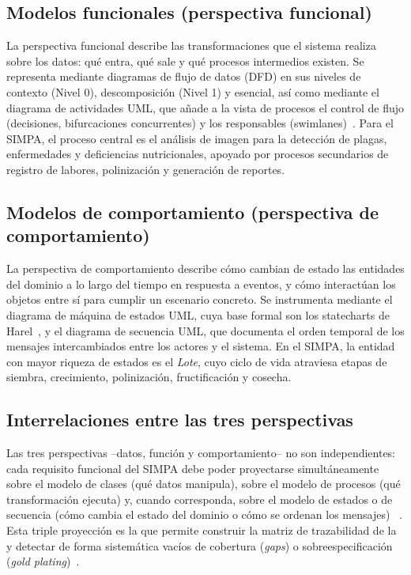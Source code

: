 \documentclass[11pt,a4paper]{report}
\begin{document}
\subsection{Modelos funcionales (perspectiva funcional)}

La perspectiva funcional describe las transformaciones que el sistema realiza sobre los datos: qué
entra, qué sale y qué procesos intermedios existen. Se representa mediante diagramas de flujo de datos
(DFD) en sus niveles de contexto (Nivel 0), descomposición (Nivel 1) y esencial, así como mediante el
diagrama de actividades UML, que añade a la vista de procesos el control de flujo (decisiones,
bifurcaciones concurrentes) y los responsables (swimlanes)~\cite{maciaszek2007,swebok2024}. Para el
SIMPA, el proceso central es el análisis de imagen para la detección de plagas, enfermedades y
deficiencias nutricionales, apoyado por procesos secundarios de registro de labores, polinización y
generación de reportes.

\subsection{Modelos de comportamiento (perspectiva de comportamiento)}

La perspectiva de comportamiento describe cómo cambian de estado las entidades del dominio a lo largo
del tiempo en respuesta a eventos, y cómo interactúan los objetos entre sí para cumplir un escenario
concreto. Se instrumenta mediante el diagrama de máquina de estados UML, cuya base formal son los
statecharts de Harel~\cite{harel1987}, y el diagrama de secuencia UML, que documenta el orden temporal
de los mensajes intercambiados entre los actores y el sistema. En el SIMPA, la entidad con mayor
riqueza de estados es el \textit{Lote}, cuyo ciclo de vida atraviesa etapas de siembra, crecimiento,
polinización, fructificación y cosecha.

\subsection{Interrelaciones entre las tres perspectivas}

Las tres perspectivas --datos, función y comportamiento-- no son independientes: cada requisito
funcional del SIMPA debe poder proyectarse simultáneamente sobre el modelo de clases (qué datos
manipula), sobre el modelo de procesos (qué transformación ejecuta) y, cuando corresponda, sobre el
modelo de estados o de secuencia (cómo cambia el estado del dominio o cómo se ordenan los mensajes)
~\cite{pohl2025,maciaszek2007}. Esta triple proyección es la que permite construir la matriz de
trazabilidad de la  y detectar de forma sistemática vacíos de cobertura
(\textit{gaps}) o sobreespecificación (\textit{gold plating})~\cite{ieee29148}.
\end{document}
